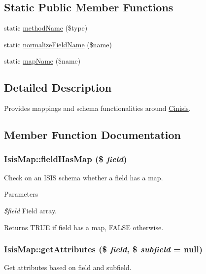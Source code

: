 \subsection*{Static Public Member Functions}
\begin{DoxyCompactItemize}
\item 
static \hyperlink{classIsisMap_af80aedabfeca623a9022dfcbc95d591c}{methodName} (\$type)
\item 
static \hyperlink{classIsisMap_ae2abf0591a4862f537fa23537ffca705}{normalizeFieldName} (\$name)
\item 
static \hyperlink{classIsisMap_a7f1b9b1cce7a02dea704a40ca85e2117}{mapName} (\$name)
\end{DoxyCompactItemize}


\subsection{Detailed Description}
Provides mappings and schema functionalities around \hyperlink{classCinisis}{Cinisis}. 

\subsection{Member Function Documentation}
\hypertarget{classIsisMap_af94e1fc5d73a6272f04a60c0acaeb409}{
\subsubsection[{fieldHasMap}]{\setlength{\rightskip}{0pt plus 5cm}IsisMap::fieldHasMap (\$ {\em field})}}
\label{classIsisMap_af94e1fc5d73a6272f04a60c0acaeb409}
Check on an ISIS schema whether a field has a map.


\begin{DoxyParams}{Parameters}
\item[{\em \$field}]Field array.\end{DoxyParams}
\begin{DoxyReturn}{Returns}
TRUE if field has a map, FALSE otherwise. 
\end{DoxyReturn}
\hypertarget{classIsisMap_a64c7193dd61a21c1af3624152d31ee51}{
\subsubsection[{getAttributes}]{\setlength{\rightskip}{0pt plus 5cm}IsisMap::getAttributes (\$ {\em field}, \/  \$ {\em subfield} = {\ttfamily null})}}
\label{classIsisMap_a64c7193dd61a21c1af3624152d31ee51}
Get attributes based on field and subfield.


